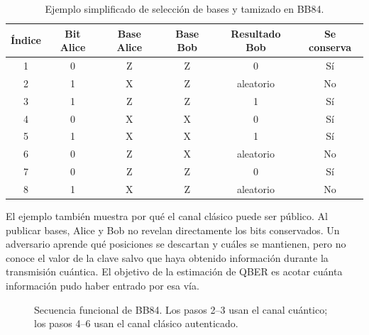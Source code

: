 \begin{table}[H]
  \centering
  \begin{tabular}{c c c c c c}
    \toprule
    Índice & Bit Alice & Base Alice & Base Bob & Resultado Bob & Se conserva \\
    \midrule
    1 & 0 & Z & Z & 0 & Sí \\
    2 & 1 & X & Z & aleatorio & No \\
    3 & 1 & Z & Z & 1 & Sí \\
    4 & 0 & X & X & 0 & Sí \\
    5 & 1 & X & X & 1 & Sí \\
    6 & 0 & Z & X & aleatorio & No \\
    7 & 0 & Z & Z & 0 & Sí \\
    8 & 1 & X & Z & aleatorio & No \\
    \bottomrule
  \end{tabular}
  \caption{Ejemplo simplificado de selección de bases y tamizado en BB84.}
  \label{tab:bb84_ejemplo}
\end{table}

El ejemplo también muestra por qué el canal clásico puede ser público. Al publicar bases, Alice y Bob no revelan directamente los bits conservados. Un adversario aprende qué posiciones se descartan y cuáles se mantienen, pero no conoce el valor de la clave salvo que haya obtenido información durante la transmisión cuántica. El objetivo de la estimación de QBER es acotar cuánta información pudo haber entrado por esa vía.

\begin{figure}[H]
  \centering
  \caption{Secuencia funcional de BB84. Los pasos 2--3 usan el canal cuántico; los pasos 4--6 usan el canal clásico autenticado.}
  \label{fig:secuencia_bb84}
\end{figure}

